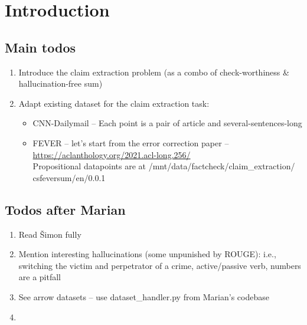 \section{Introduction}\label{sec:intro}
\todo{}
\subsection{Main todos}
\begin{enumerate}
    \item Introduce the claim extraction problem (as a combo of check-worthiness \& hallucination-free sum)
    \item Adapt existing dataset for the claim extraction task:
     \begin{itemize}
        \item CNN-Dailymail -- Each point is a pair of article and several-sentences-long 
        \item FEVER -- let's start from the error correction paper -- \url{https://aclanthology.org/2021.acl-long.256/}\\
        Propositional datapoints are at /mnt/data/factcheck/claim\_extraction/ csfeversum/en/0.0.1
    \end{itemize}
\end{enumerate}

\subsection{Todos after Marian}
\begin{enumerate}
    \item Read Šimon fully
    \item Mention interesting hallucinations (some unpunished by ROUGE):  i.e., switching the victim and perpetrator of a crime, active/passive verb, numbers are a pitfall
    \item See arrow datasets -- use dataset\_handler.py from Marian's codebase
    \item 
\end{enumerate}